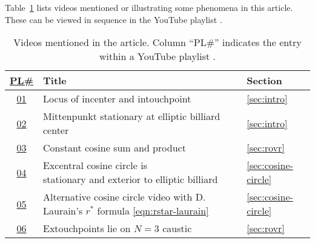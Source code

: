 Table~\ref{tab:playlist} lists videos mentioned or illustrating some phenomena in this article. These can be viewed in sequence in the YouTube playlist \cite{reznik2020-playlist-proofs}.

\begin{table}[H]
\caption{Videos mentioned in the article. Column ``PL\#'' indicates the entry within a YouTube playlist \cite{reznik2020-playlist-proofs}.}
\begin{tabular}{c|l|l}
\href{https://bit.ly/2Gmn73e}{PL\#} & Title & Section\\
\hline

\href{https://youtu.be/9xU6T7hQMzs}{01} &
{Locus of incenter and intouchpoint} & \ref{sec:intro} \\

\href{https://youtu.be/tMrBqfRBYik}{02} &
{Mittenpunkt stationary at elliptic billiard center} & \ref{sec:intro} \\

\href{https://youtu.be/P8ykpE_ZbZ8}{03} &
{Constant cosine sum and product} &
\ref{sec:rovr} \\

\href{https://youtu.be/ACinCf-D_Ok}{04} &
\makecell[lt]{Excentral cosine circle is\\stationary and exterior to elliptic billiard} &
\ref{sec:cosine-circle}\\

\href{https://youtu.be/hCQIT6_XhaQ}{05} &
\makecell[lt]{Alternative cosine circle video\\with D. Laurain's $r^*$ formula \eqref{eqn:rstar-laurain}} &
\ref{sec:cosine-circle}\\

\href{https://youtu.be/1gYb5Y3-rQI}{06} & Extouchpoints lie on $N=3$ caustic
 &
\ref{sec:rovr}\\

\end{tabular}
\label{tab:playlist}
\end{table}